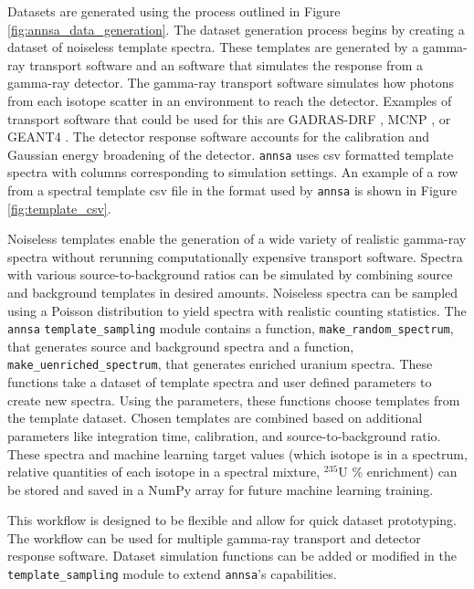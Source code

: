 Datasets are generated using the process outlined in Figure \ref{fig:annsa_data_generation}. The dataset generation process begins by creating a dataset of noiseless template spectra. These templates are generated by a gamma-ray transport software and an software that simulates the response from a gamma-ray detector. The gamma-ray transport software simulates how photons from each isotope scatter in an environment to reach the detector. Examples of transport software that could be used for this are GADRAS-DRF \cite{mitchell2014}, MCNP \cite{Goorley2016}, or GEANT4 \cite{geant4}. The detector response software accounts for the calibration and Gaussian energy broadening of the detector. \verb|annsa| uses csv formatted template spectra with columns corresponding to simulation settings. An example of a row from a spectral template csv file in the format used by \verb|annsa| is shown in Figure \ref{fig:template_csv}.

Noiseless templates enable the generation of a wide variety of realistic gamma-ray spectra without rerunning computationally expensive transport software. Spectra with various source-to-background ratios can be simulated by combining source and background templates in desired amounts. Noiseless spectra can be sampled using a Poisson distribution to yield spectra with realistic counting statistics. The \verb|annsa| \verb|template_sampling| module contains a function, \verb|make_random_spectrum|, that generates source and background spectra and a function, \verb|make_uenriched_spectrum|, that generates enriched uranium spectra. These functions take a dataset of template spectra and user defined parameters to create new spectra. Using the parameters, these functions choose templates from the template dataset. Chosen templates are combined based on additional parameters like integration time, calibration, and source-to-background ratio. These spectra and machine learning target values (which isotope is in a spectrum, relative quantities of each isotope in a spectral mixture, $^{235}$U \% enrichment) can be stored and saved in a NumPy array for future machine learning training.

This workflow is designed to be flexible and allow for quick dataset prototyping. The workflow can be used for multiple gamma-ray transport and detector response software. Dataset simulation functions can be added or modified in the \verb|template_sampling| module to extend \verb|annsa|'s capabilities.





